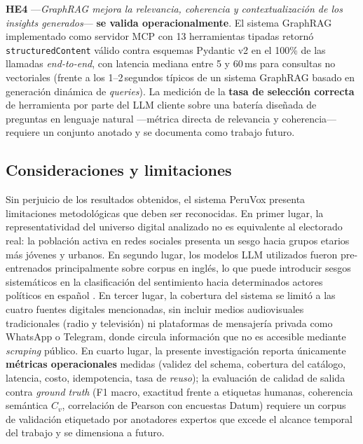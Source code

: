 \textbf{HE4} —\textit{GraphRAG mejora la relevancia, coherencia y
contextualización de los insights generados}— \textbf{se valida
operacionalmente}. El sistema GraphRAG implementado como servidor MCP con 13
herramientas tipadas retornó \texttt{structuredContent} válido contra esquemas
Pydantic v2 en el 100\% de las llamadas \textit{end-to-end}, con latencia
mediana entre 5 y 60\,ms para consultas no vectoriales (frente a los
1--2\,segundos típicos de un sistema GraphRAG basado en generación dinámica de
\textit{queries}). La medición de la \textbf{tasa de selección correcta} de
herramienta por parte del LLM cliente sobre una batería diseñada de preguntas
en lenguaje natural —métrica directa de relevancia y coherencia— requiere un
conjunto anotado y se documenta como trabajo futuro.

\subsection*{Consideraciones y limitaciones}
Sin perjuicio de los resultados obtenidos, el sistema PeruVox presenta limitaciones
metodológicas que deben ser reconocidas. En primer lugar, la representatividad del
universo digital analizado no es equivalente al electorado real: la población
activa en redes sociales presenta un sesgo hacia grupos etarios más jóvenes y
urbanos. En segundo lugar, los modelos LLM utilizados fueron pre-entrenados
principalmente sobre corpus en inglés, lo que puede introducir sesgos sistemáticos
en la clasificación del sentimiento hacia determinados actores políticos en español
\parencite{pr_gujral2024llm_elections}. En tercer lugar, la cobertura del sistema
se limitó a las cuatro fuentes digitales mencionadas, sin incluir medios
audiovisuales tradicionales (radio y televisión) ni plataformas de mensajería
privada como WhatsApp o Telegram, donde circula información que no es accesible
mediante \textit{scraping} público. En cuarto lugar, la presente investigación
reporta únicamente \textbf{métricas operacionales} medidas (validez del schema,
cobertura del catálogo, latencia, costo, idempotencia, tasa de \textit{reuso});
la evaluación de calidad de salida contra \textit{ground truth} (F1 macro,
exactitud frente a etiquetas humanas, coherencia semántica $C_v$, correlación de
Pearson con encuestas Datum) requiere un corpus de validación etiquetado por
anotadores expertos que excede el alcance temporal del trabajo y se dimensiona
a futuro.
